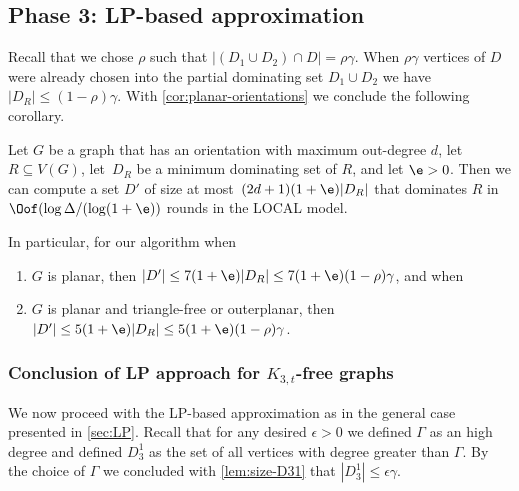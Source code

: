 
\subsection{Phase 3: LP-based approximation}\label{sec:LP-planar}


Recall that we chose $\rho$ such that $|(D_1 \cup D_2)\cap D| =\rho\gamma$.
When $\rho\gamma$ vertices of $D$ were already chosen into
the partial dominating set $D_1\cup D_2$ we have $|D_R|\leq (1-\rho)\gamma$.
With \cref{cor:planar-orientations} we conclude the following corollary.


\begin{corollary}\label{cor:LP-approx}
  Let $G$ be a graph that has an orientation with maximum out-degree
  $d$, let $R\subseteq V(G)$, let~$D_R$ be a
  minimum dominating set of $R$, and let $\e>0$. Then we can
  compute a set $D'$ of size at most~$(2d+1)(1+\e)|D_R|$ that dominates
  $R$ in $\Oof(\log \Delta/(\log (1+\e))$ rounds in the LOCAL
  model.

  In particular, for our algorithm when

  \vspace{-2mm}
  \begin{enumerate}
    \item $G$ is planar, then $|D'|\leq 7(1+\e)|D_R|
      \leq 7(1+\e)(1-\rho)\gamma$, and when
    \item $G$ is planar and triangle-free or outerplanar, then
      $|D'|\leq 5(1+\e)|D_R|\leq 5(1+\e)(1-\rho)\gamma$.
  \end{enumerate}
\end{corollary}

\subsubsection{Conclusion of LP approach for $K_{3,t}$-free graphs}


We now proceed with the LP-based approximation as in the general case
presented in \cref{sec:LP}. Recall that for any desired $\epsilon>0$ 
we defined $\Gamma$ as an high degree and defined 
$D_3^1$ as the set of all vertices with degree greater than $\Gamma$. 
By the choice of $\Gamma$ we concluded with \cref{lem:size-D31}
that $|D_3^1|\leq \epsilon\gamma$. 

